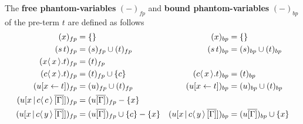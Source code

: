 \documentclass[runningheads]{llncs}
\let\vec\relax
\newcommand\defn{\textbf}
\newcommand{\fp}[1]{(#1)_{fp}}
\newcommand{\bp}[1]{(#1)_{bp}}
\newcommand{\set}[1]{ \{ #1 \} }
\newcommand{\app}[2]{#1 \, #2}
\newcommand{\fake}[3]{#1 \langle \, #2 \, \rangle . #3}
\newcommand{\share}[3]{#1 [#2 \leftarrow #3]}
\newcommand{\dist}[5]{#1 [ #2 \, \vert \, \fakedist{#4}{#5} \, #3 ]}
\newcommand{\fakedist}[2]{#1 \langle \, #2 \, \rangle}
\begin{document}
\begin{definition}
\label{def:freeboundphan}
The \defn{free phantom-variables} $\fp{-}$ and \defn{bound phantom-variables} $\bp{-}$ of the pre-term $t$ are defined as follows
\begingroup
\allowdisplaybreaks
	\begin{align*}
		\fp{x} &= \set{} & \bp{x} &= \set{} \\
		\fp{\app{s}{t}} &= \fp{s} \cup \fp{t} & \bp{\app{s}{t}} &= \bp{s} \cup \bp{t} \\
		\fp{\fake{x}{x}{t}} &= \fp{t} \\ %
		\fp{\fake{c}{\vec{x}}{t}} &= \fp{t} \cup \set{c}& \bp{\fake{c}{\vec{x}}{t}} &= \bp{t} \\
		\fp{\share{u}{\vec{x}}{t}} &= \fp{u} \cup \fp{t} & \bp{\share{u}{\vec{x}}{t}} &= \bp{u} \cup \bp{t}\\
		\fp{\dist{u}{\vec x}{\overline{[\Gamma]}}cc} &= \fp{u \overline{[\Gamma]}} - \set{\vec x} \\
		\fp{\dist{u}{\vec x}{\overline{[\Gamma]}}c{\vec{y}}} &= \fp{u \overline{[\Gamma]}} \cup \set c - \set{\vec x}
	&	\bp{\dist{u}{\vec x}{\overline{[\Gamma]}}c{\vec{y}}} &= \bp{u \overline{[\Gamma]}} \cup \set{\vec x}
	\end{align*}
\endgroup
\end{definition}
\end{document}
